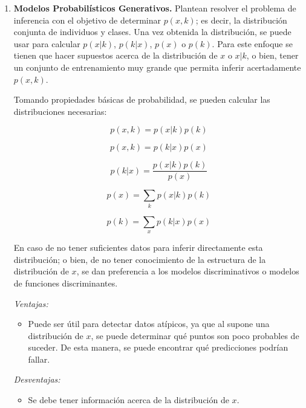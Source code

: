 \begin{enumerate}
	\item  \textbf{Modelos Probabilísticos Generativos.}
    Plantean resolver el problema de inferencia con el objetivo de determinar $p(x,k)$; es decir, la distribución conjunta de individuos y clases. Una vez obtenida la distribución, se puede usar para calcular $p(x|k)$, $p(k|x)$, $p(x)$ o $p(k)$. Para este enfoque se tienen que hacer supuestos acerca de la distribución de $x$ o $x|k$, o bien, tener un conjunto de entrenamiento muy grande que permita inferir acertadamente $p(x,k)$.

    Tomando propiedades básicas de probabilidad, se pueden calcular las distribuciones necesarias:
  
    \begin{equation} \label{eq:1}
     p(x, k) = p(x|k) p(k)
    \end{equation}

    \begin{equation} \label{eq:2}
     p(x, k) = p(k|x) p(x) 
    \end{equation}
    
    \begin{equation} \label{eq:3}
     p(k|x)  = \frac{p(x|k)p(k)}{p(x)}
    \end{equation}

	\begin{equation} \label{eq:4}
	 p(x) = \sum_{k} p(x|k)p(k) 
	\end{equation}
	
	\begin{equation} \label{eq:5}
	 p(k) = \sum_{x} p(k|x)p(x) 
	\end{equation}
	
	En caso de no tener suficientes datos para inferir directamente esta distribución; o bien, de no tener conocimiento de la estructura de la distribución de $x$, se dan preferencia a los modelos discriminativos o modelos de funciones discriminantes.

\textit{Ventajas\cite{bishop2006pattern}:}
\begin{itemize}
\item Puede ser útil para detectar datos atípicos, ya que al supone una distribución de $x$, se puede determinar qué puntos son poco probables de suceder. De esta manera, se puede encontrar qué predicciones podrían fallar. 
\end{itemize}

\textit{Desventajas\cite{bishop2006pattern}:}
\begin{itemize}
\item Se debe tener información acerca de la distribución de $x$.


\end{itemize}
\end{enumerate}
